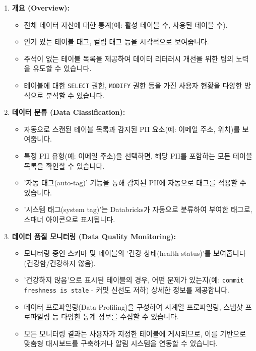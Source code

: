 \documentclass[11pt,a4paper]{article}
\begin{document}
\begin{enumerate}
    \item \textbf{개요 (Overview):}
    \begin{itemize}
        \item 전체 데이터 자산에 대한 통계(예: 활성 테이블 수, 사용된 테이블 수).
        \item 인기 있는 테이블 태그, 컬럼 태그 등을 시각적으로 보여줍니다.
        \item 주석이 없는 테이블 목록을 제공하여 데이터 리터러시 개선을 위한 팀의 노력을 유도할 수 있습니다.
        \item 테이블에 대한 \texttt{SELECT} 권한, \texttt{MODIFY} 권한 등을 가진 사용자 현황을 다양한 방식으로 분석할 수 있습니다.
    \end{itemize}
    \item \textbf{데이터 분류 (Data Classification):}
    \begin{itemize}
        \item 자동으로 스캔된 테이블 목록과 감지된 PII 요소(예: 이메일 주소, 위치)를 보여줍니다.
        \item 특정 PII 유형(예: 이메일 주소)을 선택하면, 해당 PII를 포함하는 모든 테이블 목록을 확인할 수 있습니다.
        \item '자동 태그(auto-tag)' 기능을 통해 감지된 PII에 자동으로 태그를 적용할 수 있습니다.
        \item '시스템 태그(system tag)'는 Databricks가 자동으로 분류하여 부여한 태그로, 스패너 아이콘으로 표시됩니다.
    \end{itemize}
    \item \textbf{데이터 품질 모니터링 (Data Quality Monitoring):}
    \begin{itemize}
        \item 모니터링 중인 스키마 및 테이블의 '건강 상태(health status)'를 보여줍니다 (건강함/건강하지 않음).
        \item '건강하지 않음'으로 표시된 테이블의 경우, 어떤 문제가 있는지(예: \texttt{commit freshness is stale} - 커밋 신선도 저하) 상세한 정보를 제공합니다.
        \item 데이터 프로파일링(Data Profiling)을 구성하여 시계열 프로파일링, 스냅샷 프로파일링 등 다양한 통계 정보를 수집할 수 있습니다.
        \item 모든 모니터링 결과는 사용자가 지정한 테이블에 게시되므로, 이를 기반으로 맞춤형 대시보드를 구축하거나 알림 시스템을 연동할 수 있습니다.
    \end{itemize}
\end{enumerate}
\end{document}
